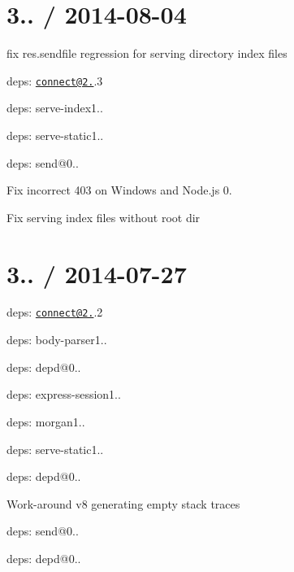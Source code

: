{\ttfamily \section*{3.. / 2014-\/08-\/04 }}

{\ttfamily }

{\ttfamily 
\begin{DoxyItemize}
\item fix {\ttfamily res.\+sendfile} regression for serving directory index files
\item deps\+: \href{mailto:connect@2.24}{\tt connect@2.}.3
\begin{DoxyItemize}
\item deps\+: serve-\/index1..
\item deps\+: serve-\/static1..
\end{DoxyItemize}
\item deps\+: send@0..
\begin{DoxyItemize}
\item Fix incorrect 403 on Windows and Node.\+js 0.
\item Fix serving index files without root dir
\end{DoxyItemize}
\end{DoxyItemize}}

{\ttfamily \section*{3.. / 2014-\/07-\/27 }}

{\ttfamily }

{\ttfamily 
\begin{DoxyItemize}
\item deps\+: \href{mailto:connect@2.24}{\tt connect@2.}.2
\begin{DoxyItemize}
\item deps\+: body-\/parser1..
\item deps\+: depd@0..
\item deps\+: express-\/session1..
\item deps\+: morgan1..
\item deps\+: serve-\/static1..
\end{DoxyItemize}
\item deps\+: depd@0..
\begin{DoxyItemize}
\item Work-\/around v8 generating empty stack traces
\end{DoxyItemize}
\item deps\+: send@0..
\begin{DoxyItemize}
\item deps\+: depd@0..
\end{DoxyItemize}
\end{DoxyItemize}}

